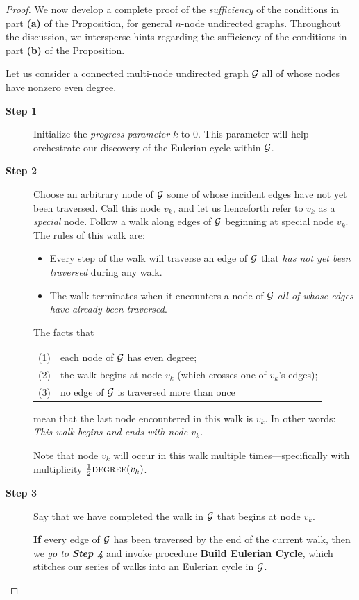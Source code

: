 \begin{proof}
We now develop a complete proof of the {\em sufficiency} of the
conditions in part {\bf (a)} of the Proposition, for general $n$-node
undirected graphs.  Throughout the discussion, we intersperse hints
regarding the sufficiency of the conditions in part {\bf (b)} of the
Proposition.

Let us consider a connected multi-node undirected graph $\mbox{$\cal G$}$ all of
whose nodes have nonzero even degree.
\begin{description}
\item[{\bf Step 1}]
Initialize the {\it progress parameter} $k$ to $0$.  This parameter
will help orchestrate our discovery of the Eulerian cycle within $\mbox{$\cal G$}$.

\item[{\bf Step 2}]
Choose an arbitrary node of $\mbox{$\cal G$}$ some of whose incident edges have not
yet been traversed.  Call this node $v_k$, and let us henceforth refer
to $v_k$ as a {\em special} node.  Follow a walk along edges of $\mbox{$\cal G$}$
beginning at special node $v_k$.  The rules of this walk are:
  \begin{itemize}
  \item
Every step of the walk will traverse an edge of $\mbox{$\cal G$}$ that {\em has not
  yet been traversed} during any walk.
  \item
The walk terminates when it encounters a node of $\mbox{$\cal G$}$ {\em all of
  whose edges have already been traversed}.
  \end{itemize}
The facts that 

\hspace*{.25in}\begin{tabular}{ll}
(1) & each node of $\mbox{$\cal G$}$ has even degree; \\
(2) & the walk begins at node $v_k$ (which crosses one of $v_k$'s edges); \\
(3) & no edge of $\mbox{$\cal G$}$ is traversed more than once
\end{tabular}

\noindent
mean that the last node encountered in this walk is $v_k$.  In other
words: {\em This walk begins and ends with node $v_k$.}

Note that node $v_k$ will occur in this walk multiple
times---specifically with multiplicity $\frac{1}{2} \mbox{\sc
  degree}(v_k)$.

\item[{\bf Step 3}]
Say that we have completed the walk in $\mbox{$\cal G$}$ that begins at node $v_k$.

\smallskip

{\bf If} every edge of $\mbox{$\cal G$}$ has been traversed by the end of the
current walk, then we {\it go to {\bf Step 4}} and invoke procedure
{\bf Build Eulerian Cycle}, which stitches our series of walks into an
Eulerian cycle in $\mbox{$\cal G$}$.


\end{description}
\end{proof}
